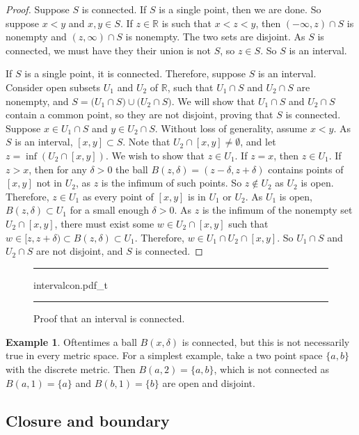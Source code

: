 \documentclass[12pt,openany]{book}
\newcommand{\R}{{\mathbb{R}}}
\theoremstyle{plain}
\theoremstyle{remark}
\theoremstyle{definition}
\newenvironment{myfig}{%
\begin{figure}[h!t]
\noindent\rule{\textwidth}{0.4pt}\vspace{12pt}\par\centering}%
{\par\noindent\rule{\textwidth}{0.4pt}
\end{figure}}
\theoremstyle{exercise}
\theoremstyle{example}
\newtheorem{example}[thm]{Example}
\begin{document}
\begin{proof}
Suppose $S$ is connected.  If $S$ is a single point,
then we are done.  So suppose $x < y$ and $x,y \in S$.  If $z \in \R$ is such
that $x < z < y$, then $(-\infty,z) \cap S$ is nonempty and $(z,\infty) \cap
S$ is nonempty.  The two sets are disjoint.  As
$S$ is connected, we must have they their union is not $S$, so $z \in S$.
So $S$ is an interval.

If $S$ is a single point, it is connected.
Therefore, suppose $S$ is an interval.
Consider open subsets $U_1$ and $U_2$ of $\R$, such that
$U_1 \cap S$ and $U_2 \cap S$ are nonempty, and
$S = 
\bigl( U_1 \cap S \bigr)
\cup
\bigl( U_2 \cap S \bigr)$.  We will show that $U_1 \cap S$
and $U_2 \cap S$ contain a common point, so they are not disjoint,
proving that $S$ is connected.
Suppose $x \in U_1 \cap S$
and $y \in U_2 \cap S$.  Without loss of generality, assume $x < y$.
As $S$ is an interval, $[x,y] \subset S$.
Note that $U_2 \cap [x,y] \not= \emptyset$, and
let $z = \inf (U_2 \cap [x,y])$.
We wish to show that $z \in U_1$.
If $z = x$, then $z \in U_1$.
If $z > x$,
then for any $\delta > 0$ the ball $B(z,\delta) =
(z-\delta,z+\delta)$ contains points of $[x,y]$ not in $U_2$,
as $z$ is the infimum of such points.
So $z \notin U_2$ as $U_2$ is open.
Therefore, $z \in U_1$ as every point of $[x,y]$ is in
$U_1$ or $U_2$.
As $U_1$ is open,
$B(z,\delta) \subset U_1$ for a small enough $\delta > 0$.
As $z$ is the infimum of the nonempty set $U_2 \cap [x,y]$, 
there must exist some $w \in U_2 \cap [x,y]$
such that $w \in [z,z+\delta) \subset B(z,\delta) \subset U_1$.
Therefore, $w \in U_1 \cap U_2 \cap [x,y]$.
So $U_1 \cap S$ and $U_2 \cap S$ are not disjoint, and
$S$ is connected.
\end{proof}

\begin{myfig}
{intervalcon.pdf_t}
\caption{Proof that an interval is connected.\label{fig:intervalcon}}
\end{myfig}

\begin{example}
Oftentimes a ball $B(x,\delta)$ is connected, but this is not
necessarily true in every metric space.
For a simplest example, take a two point space $\{ a,
b\}$ with the discrete metric.  Then $B(a,2) = \{ a , b \}$, which is not
connected as $B(a,1) = \{ a \}$ and 
$B(b,1) = \{ b \}$ are open and disjoint.
\end{example}

\subsection{Closure and boundary}
\end{document}

